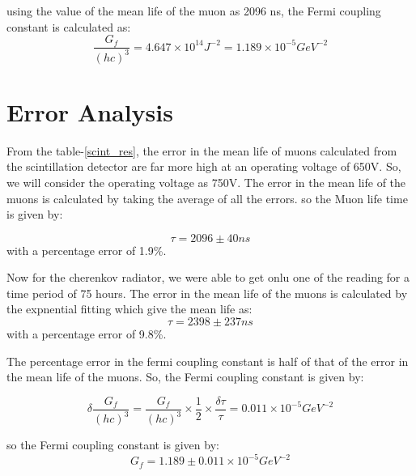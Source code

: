 \documentclass{article}
\begin{document}
\begin{multicols}{2}
using the value of the mean life of the muon as 2096 ns, the Fermi coupling constant is calculated as:
\begin{equation}
    \frac{G_f}{(hc)^3} = 4.647 \times 10^{14} J^{-2} = 1.189 \times 10^{-5} GeV^{-2} 
\end{equation}


\section{\label{error}Error Analysis}

From the table-\ref{scint_res}, the error in the mean life of muons calculated from the scintillation detector are far more high at an operating voltage of 650V. So, we will consider the operating voltage as 750V. The error in the mean life of the muons is calculated by taking the average of all the errors.
so the Muon life time is given by:

\begin{equation}
    \tau = 2096 \pm 40 ns
\end{equation}
with a percentage error of 1.9\%.


Now for the cherenkov radiator, we were able to get onlu one of the reading for a time period of 75 hours. The error in the mean life of the muons is calculated by the expnential fitting which give the mean life as:
\begin{equation}
    \tau = 2398 \pm 237 ns
\end{equation}
with a percentage error of 9.8\%.


The percentage error in the fermi coupling constant is half of that of the error in the mean life of the muons. So, the Fermi coupling constant is given by:

\begin{equation}
    \delta \frac{G_f}{(hc)^3} = \frac{G_f}{(hc)^3} \times \frac{1}{2} \times \frac{\delta \tau}{\tau} = 0.011 \times 10^{-5} GeV^{-2}
\end{equation}

so the Fermi coupling constant is given by:
\begin{equation}
    G_f = 1.189 \pm 0.011 \times 10^{-5} GeV^{-2}
\end{equation}




\end{multicols}
\end{document}
